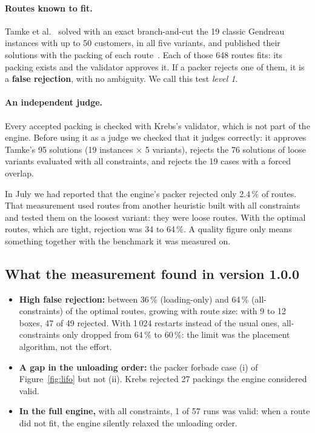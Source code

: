 \documentclass[11pt,a4paper]{article}
\begin{document}
\paragraph{Routes known to fit.} Tamke et al.~\cite{tamke2025} solved with an exact branch-and-cut the
19 classic Gendreau instances with up to 50 customers, in all five variants, and published their
solutions with the packing of each route~\cite{tamkerepo}. Each of those 648 routes fits: its packing
exists and the validator approves it. If a packer rejects one of them, it is a \textbf{false
rejection}, with no ambiguity. We call this test \emph{level 1}.

\paragraph{An independent judge.} Every accepted packing is checked with Krebs's validator, which is
not part of the engine. Before using it as a judge we checked that it judges correctly: it approves
Tamke's 95 solutions (19 instances $\times$ 5 variants), rejects the 76 solutions of loose variants
evaluated with all constraints, and rejects the 19 cases with a forced overlap.

\begin{leccion}
In July we had reported that the engine's packer rejected only 2.4\,\% of routes. That measurement used
routes from another heuristic built with all constraints and tested them on the loosest variant: they
were loose routes. With the optimal routes, which are tight, rejection was 34 to 64\,\%. A quality
figure only means something together with the benchmark it was measured on.
\end{leccion}

\subsection{What the measurement found in version 1.0.0}

\begin{itemize}[leftmargin=1.5em]
\item \textbf{High false rejection:} between 36\,\% (loading-only) and 64\,\% (all-constraints) of the
optimal routes, growing with route size: with 9 to 12 boxes, 47 of 49 rejected. With 1\,024 restarts
instead of the usual ones, all-constraints only dropped from 64\,\% to 60\,\%: the limit was the
placement algorithm, not the effort.
\item \textbf{A gap in the unloading order:} the packer forbade case (i) of Figure~\ref{fig:lifo} but
not (ii). Krebs rejected 27 packings the engine considered valid.
\item \textbf{In the full engine,} with all constraints, 1 of 57 runs was valid: when a route did not
fit, the engine silently relaxed the unloading order.
\end{itemize}
\end{document}
